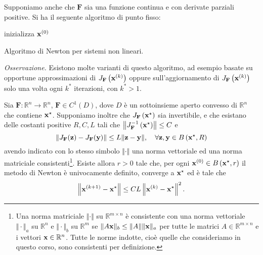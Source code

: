 Supponiamo anche che $\mathbf{F}$ sia una funzione continua e con derivate parziali positive.
Si ha il seguente algoritmo di punto fisso:

\begin{algo}
	inizializza $\mathbf{x}^{(0)}$\;
	\caption{Algoritmo di Newton per sistemi non lineari.}
\end{algo}
\textit{Osservazione.} Esistono molte varianti di questo algoritmo, ad esempio basate su opportune approssimazioni di $J_{\mathbf{F}}\left(\mathbf{x}^{(k)}\right)$ oppure sull'aggiornamento di $J_{\mathbf{F}}\left(\mathbf{x}^{(k)}\right)$ solo una volta ogni $k^*$ iterazioni, con $k^* > 1$.
\begin{theorem}
Sia $\mathbf{F} :\mathbb{R}^{n}\rightarrow \mathbb{R}^{n}$, $\mathbf{F} \in C^{1}(D)$, dove $D$ è un sottoinsieme aperto convesso di $\mathbb{R}^{n}$ che contiene $\mathbf{x}^{\star }$. Supponiamo inoltre che $J_{\mathbf{F}}\left(\mathbf{x}^{\star }\right)$ sia invertibile, e che esistano delle costanti positive $R,C,L$ tali che $\left\Vert J^{-1}_{\mathbf{F}}\left(\mathbf{x}^{\star }\right)\right\Vert \leq C$ e
\begin{equation*}
\Vert J_{\mathbf{F}}(\mathbf{z}) -J_{\mathbf{F}}(\mathbf{y})\Vert \leq L\Vert \mathbf{z} -\mathbf{y}\Vert ,\quad \forall \mathbf{z} ,\mathbf{y} \in B\left(\mathbf{x}^{\star } ,R\right)
\end{equation*}
avendo indicato con lo stesso simbolo $\Vert \cdot \Vert $ una norma vettoriale ed una norma matriciale consistenti\footnote{Una norma matriciale $\Vert \cdot \Vert $ su $\mathbb{R}^{m\times n}$ è consistente con una norma vettoriale $\Vert \cdot \Vert _{a}$ su $\mathbb{R}^{n}$ e $\Vert \cdot \Vert _{b}$ su $\mathbb{R}^{m}$ se $\Vert A\mathbf{x}\Vert _{b} \leq \Vert A\Vert \Vert \mathbf{x}\Vert _{a}$ per tutte le matrici $A\in \mathbb{R}^{m\times n}$ e i vettori $\mathbf{x} \in \mathbb{R}^{n}$. Tutte le norme indotte, cioè quelle che consideriamo in questo corso, sono consistenti per definizione.}.
Esiste allora $r >0$ tale che, per ogni $\mathbf{x}^{(0)} \in B\left(\mathbf{x}^{\star } ,r\right)$ il metodo di Newton è univocamente definito, converge a $\mathbf{x}^{\star }$ ed è tale che
\begin{equation*}
\left\Vert \mathbf{x}^{(k+1)} -\mathbf{x}^{\star }\right\Vert \leq CL\left\Vert \mathbf{x}^{(k)} -\mathbf{x}^{\star }\right\Vert ^{2}.
\end{equation*}
\end{theorem}
